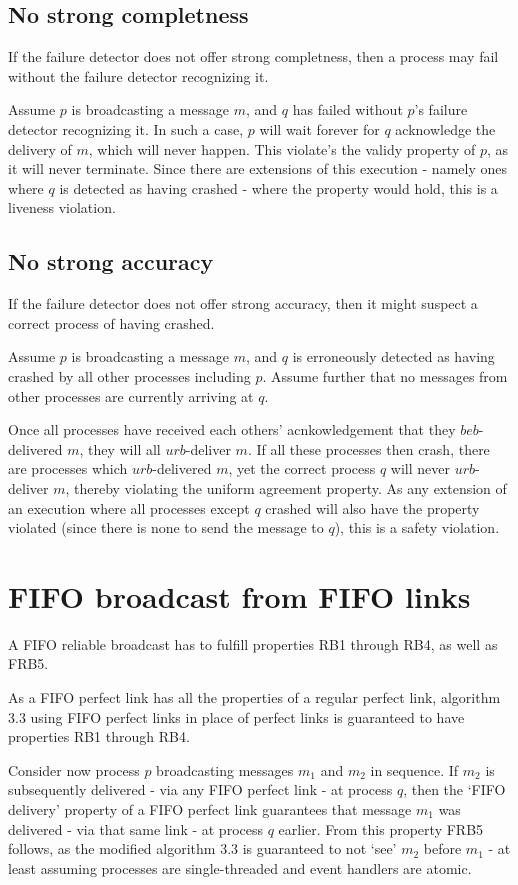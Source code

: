 \documentclass[a4paper]{scrreprt}
\begin{document}
\subsection{No strong completness}

If the failure detector does not offer strong completness, then a process may
fail without the failure detector recognizing it.

Assume $p$ is broadcasting a message $m$, and $q$ has failed without $p$'s
failure detector recognizing it. In such a case, $p$ will wait forever for $q$
acknowledge the delivery of $m$, which will never happen. This violate's the
validy property of $p$, as it will never terminate. Since there are extensions
of this execution - namely ones where $q$ is detected as having crashed - where
the property would hold, this is a liveness violation.

\subsection{No strong accuracy}

If the failure detector does not offer strong accuracy, then it might suspect a
correct process of having crashed.

Assume $p$ is broadcasting a message $m$, and $q$ is erroneously detected as
having crashed by all other processes including $p$. Assume further that no
messages from other processes are currently arriving at $q$.

Once all processes have received each others' acnkowledgement that they
$beb$-delivered $m$, they will all $urb$-deliver $m$. If all these processes
then crash, there are processes which $urb$-delivered $m$, yet the correct
process $q$ will never $urb$-deliver $m$, thereby violating the uniform
agreement property. As any extension of an execution where all processes except
$q$ crashed will also have the property violated (since there is none to send
the message to $q$), this is a safety violation.

\section{FIFO broadcast from FIFO links}

A FIFO reliable broadcast has to fulfill properties RB1 through RB4, as well as
FRB5.

As a FIFO perfect link has all the properties of a regular perfect link,
algorithm 3.3 using FIFO perfect links in place of perfect links is guaranteed
to have properties RB1 through RB4.

Consider now process $p$ broadcasting messages $m_1$ and $m_2$ in sequence. If
$m_2$ is subsequently delivered - via any FIFO perfect link - at process $q$,
then the `FIFO delivery' property of a FIFO perfect link guarantees that
message $m_1$ was delivered - via that same link - at process $q$ earlier. From
this property FRB5 follows, as the modified algorithm 3.3 is guaranteed to not
`see' $m_2$ before $m_1$ - at least assuming processes are single-threaded and
event handlers are atomic.
\end{document}
